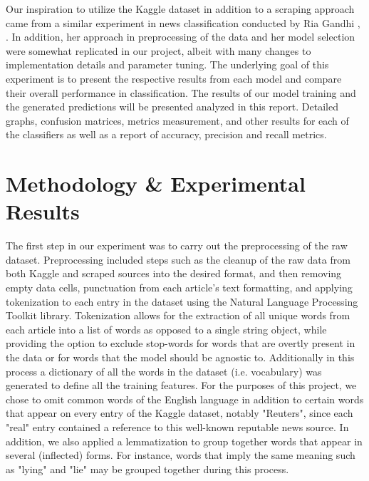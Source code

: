\documentclass[10pt,twocolumn,letterpaper]{article}
\begin{document}
Our inspiration to utilize the Kaggle dataset in addition to a scraping approach came from a similar experiment in news classification conducted by Ria Gandhi \cite{Ria}, \cite{githubRia}. In addition, her approach in preprocessing of the data and her model selection were somewhat replicated in our project, albeit with many changes to implementation details and parameter tuning. The underlying goal of this experiment is to present the respective results from each model and compare their overall performance in classification. The results of our model training and the generated predictions will be presented analyzed in this report. Detailed graphs, confusion matrices, metrics measurement, and other results  for each of the classifiers as well as a report of accuracy, precision and recall metrics. 


\section{Methodology \& Experimental Results}
\small
The first step in our experiment was to carry out the preprocessing of the raw dataset. Preprocessing included steps such as the cleanup of the raw data from both Kaggle and scraped sources into the desired format, and then removing empty data cells, punctuation from each article's text formatting, and applying tokenization to each entry in the dataset using the Natural Language Processing Toolkit library. Tokenization allows for the extraction of all unique words from each article into a list of words as opposed to a single string object, while providing the option to exclude stop-words for words that are overtly present in the data or for words that the model should be agnostic to. Additionally in this process a dictionary of all the words in the dataset (i.e. vocabulary) was generated to define all the training features. For the purposes of this project, we chose to omit common words of the English language in addition to certain words that appear on every entry of the Kaggle dataset, notably "Reuters", since each "real" entry contained a reference to this well-known reputable news source.  In addition, we also applied a lemmatization to group together words that appear in several (inflected) forms. For instance, words that imply the same meaning such as "lying" and "lie" may be grouped together during this process.\par
\end{document}
